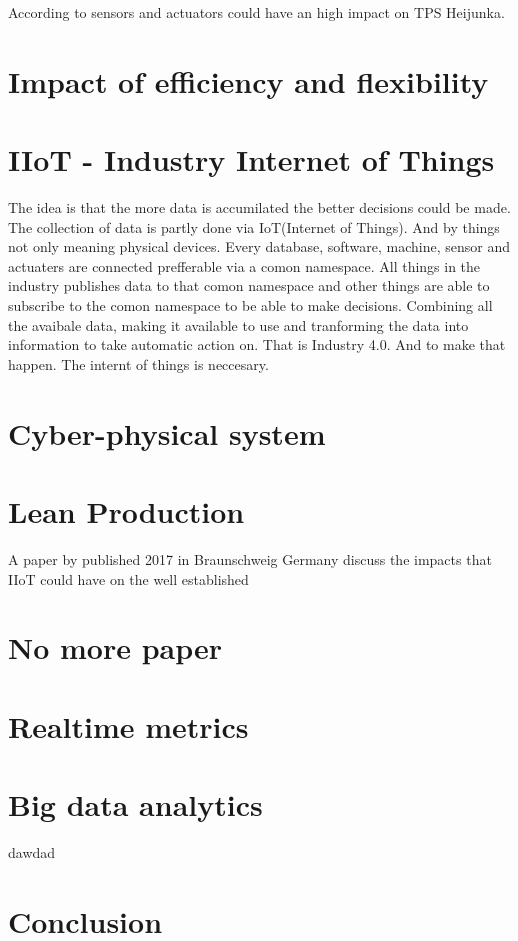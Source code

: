 \documentclass[article,a4paper]{IEEEtran}
\begin{document}
    According to  sensors and actuators could have an high impact on TPS Heijunka. 

    \section{Impact of efficiency and flexibility}

    \section{IIoT - Industry Internet of Things}
    The idea is that the more data is accumilated the better decisions could be made. The collection of data is partly done via IoT(Internet of Things). And by things not only meaning physical devices. Every database, software, machine, sensor and actuaters are connected prefferable via a comon namespace. All things in the industry publishes data to that comon namespace and other things are able to subscribe to the comon namespace to be able to make decisions. Combining all the avaibale data, making it available to use and tranforming the data into information to take automatic action on. That is Industry 4.0. And to make that happen. The internt of things is neccesary.  
    

    \section{Cyber-physical system}

    \section{Lean Production}
    A paper by published 2017 in Braunschweig Germany \cite{Impact_Lean_Prod} discuss the impacts that IIoT could have on the well established 
    



    \section{No more paper}
    \section{Realtime metrics}
    \section{Big data analytics}
    \cite{Change_Man_Landscape}
    
    dawdad
    \section{Conclusion}

\printbibliography
\end{document}
